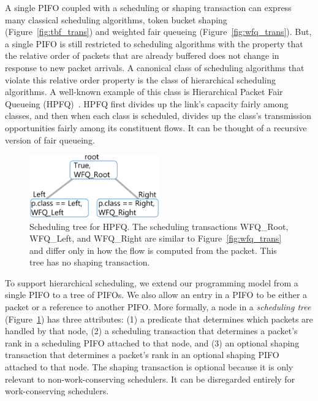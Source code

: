 A single PIFO coupled with a scheduling or shaping transaction can express many
classical scheduling algorithms, \eg token bucket shaping
(Figure~\ref{fig:tbf_trans}) and weighted fair queueing
(Figure~\ref{fig:wfq_trans}). But, a single PIFO is still restricted to
scheduling algorithms with the property that the relative order of packets that
are already buffered does not change in response to new packet arrivals. A
canonical class of scheduling algorithms that violate this relative order
property is the class of hierarchical scheduling algorithms. A well-known
example of this class is Hierarchical Packet Fair Queueing (HPFQ)~\cite{hpfq}.
HPFQ first divides up the link's capacity fairly among classes, and then when
each class is scheduled, divides up the class's transmission opportunities
fairly among its constituent flows. It can be thought of a recursive version of
fair queueing.

\begin{figure}[!t]
\centering
\includegraphics[width=0.5\textwidth]{pifo_hpfq_program.pdf}
\caption{Scheduling tree for HPFQ. The scheduling transactions WFQ\_Root,
WFQ\_Left, and WFQ\_Right are similar to Figure~\ref{fig:wfq_trans} and differ
only in how the flow is computed from the packet. This tree has no shaping
transaction.}
\label{fig:scheduling_tree}
\end{figure}

To support hierarchical scheduling, we extend our programming model from a
single PIFO to a tree of PIFOs. We also allow an entry in a PIFO to be either a
packet or a reference to another PIFO. More formally, a node in a {\em
scheduling tree} (Figure~\ref{fig:scheduling_tree}) has three attributes: (1) a
predicate that determines which packets are handled by that node, (2) a
scheduling transaction that determines a packet's rank in a scheduling PIFO
attached to that node, and (3) an optional shaping transaction that determines
a packet's rank in an optional shaping PIFO attached to that node. The shaping
transaction is optional because it is only relevant to non-work-conserving
schedulers. It can be disregarded entirely for work-conserving schedulers.

